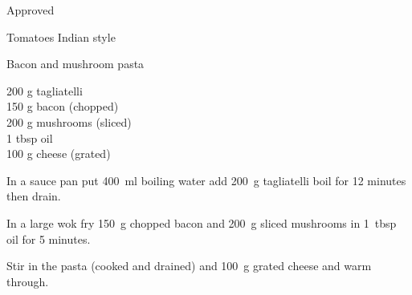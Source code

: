 \begin{menu}{Approved}
\begin{recipe}{2}{Tomatoes Indian style}
\begin{instructions}
    \end{instructions}
    \end{recipe}%
  
    \begin{recipe}{1}{Bacon and mushroom pasta}%
    
		\begin{ingredients}
		200 g tagliatelli  \\
	150 g bacon (chopped) \\
	200 g mushrooms (sliced) \\
	1 tbsp oil  \\
	100 g cheese (grated) \\
	
		\end{ingredients}
	
    \begin{instructions}
    \item 
      In a
      sauce pan
      put
      400~ml  boiling water
      add
      200~g  tagliatelli
      boil for 12 minutes then drain.
    \item 
        In a large wok fry 150~g chopped bacon
        and
        200~g sliced mushrooms
        in
        1~tbsp  oil for 5 minutes.
      \item 
        Stir in the pasta (cooked and drained)
        and 100~g grated cheese
        and warm through.
      
    \end{instructions}
    \end{recipe}%
  
    \clearpage
    \end{menu}
	
	